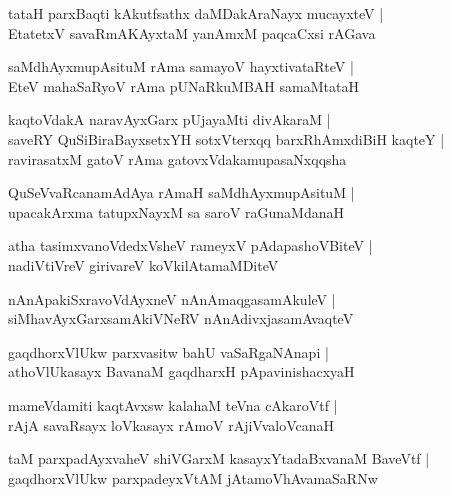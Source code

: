 \begin{shloka}
tataH parxBaqti kAkutfsathx daMDakAraNayx mucayxteV |\\
EtatetxV savaRmAKAyxtaM yanAmxM paqcaCxsi rAGava
\end{shloka}

\begin{shloka}
saMdhAyxmupAsituM rAma samayoV hayxtivataRteV |\\
EteV mahaSaRyoV rAma pUNaRkuMBAH samaMtataH 
\end{shloka}

\begin{shloka}
kaqtoVdakA naravAyxGarx pUjayaMti divAkaraM |\\
saveRY QuSiBiraBayxsetxYH sotxVterxqq barxRhAmxdiBiH kaqteY |\\
ravirasatxM gatoV rAma gatovxVdakamupasaNxqqsha
\end{shloka}

\begin{shloka}
QuSeVvaRcanamAdAya rAmaH saMdhAyxmupAsituM |\\
upacakArxma tatupxNayxM sa saroV raGunaMdanaH 
\end{shloka}

\begin{shloka}
atha tasimx\R vanoVdedxVsheV rameyxV pAdapashoVBiteV |\\
nadiVtiVreV girivareV koVkilAtamaMDiteV 
\end{shloka}

\begin{shloka}
nAnApakiSxravoVdAyxneV nAnAmaqgasamAkuleV |\\
siMhavAyxGarxsamAkiVNeRV nAnAdivxjasamAvaqteV 
\end{shloka}

\begin{shloka}
gaqdhorxVlUkw parxvasitw bahU\R{} vaSaRgaNAnapi |\\
athoVlUkasayx BavanaM gaqdharxH pApavinishacxyaH 
\end{shloka}

\begin{shloka}
mameVdamiti kaqtAvxsw kalahaM teVna cAkaroVtf |\\
rAjA savaRsayx loVkasayx rAmoV rAjiVvaloVcanaH 
\end{shloka}

\begin{shloka}
taM parxpadAyxvaheV shiVGarxM kasayxYtadaBxvanaM BaveVtf |\\
gaqdhorxVlUkw parxpadeyxVtAM jAtamoVhAvamaSaRNw
\end{shloka}

